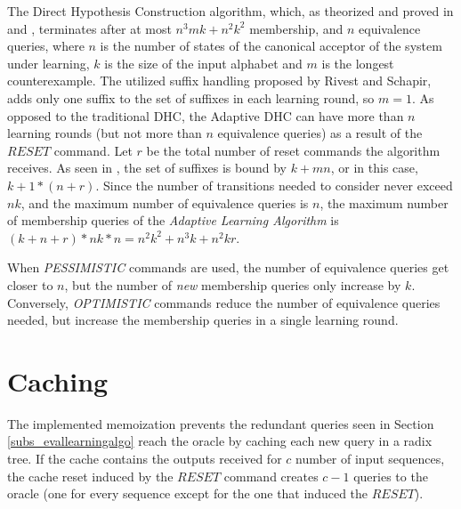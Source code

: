 The Direct Hypothesis Construction algorithm, which, as theorized and proved in \cite{Steffen2011} and \cite{10.1007/978-3-642-34781-8_19}, terminates after at most $n^3mk+n^2k^2$ membership, and $n$ equivalence queries, where $n$ is the number of states of the canonical acceptor of the system under learning, $k$ is the size of the input alphabet and $m$ is the longest counterexample. The utilized suffix handling proposed by Rivest and Schapir\cite{rivest1993inference}, adds only one suffix to the set of suffixes in each learning round, so $m=1$\cite{Steffen2011}. As opposed to the traditional DHC, the Adaptive DHC can have more than $n$ learning rounds (but not more than $n$ equivalence queries) as a result of the $RESET$ command. Let $r$ be the total number of reset commands the algorithm receives. As seen in \cite{Steffen2011}, the set of suffixes is bound by $k+mn$, or in this case, $k+1*(n+r)$. Since the number of transitions needed to consider never exceed $nk$\cite{Steffen2011}, and the maximum number of equivalence queries is $n$, the maximum number of membership queries of the \textit{Adaptive Learning Algorithm} is $(k+n+r)*nk*n = $\textbf{$ n^2k^2+n^3k+n^2kr$}.

When \textit{PESSIMISTIC} commands are used, the number of equivalence queries get closer to $n$, but the number of \textit{new} membership queries only increase by $k$. Conversely, \textit{OPTIMISTIC} commands reduce the number of equivalence queries needed, but increase the membership queries in a single learning round.
\section{Caching} \label{subs_evalcaching}

The implemented memoization prevents the redundant queries seen in Section \ref{subs_evallearningalgo} reach the oracle by caching each new query in a radix tree. If the cache contains the outputs received for $c$ number of input sequences, the cache reset induced by the $RESET$ command creates $c-1$ queries to the oracle (one for every sequence except for the one that induced the $RESET$).